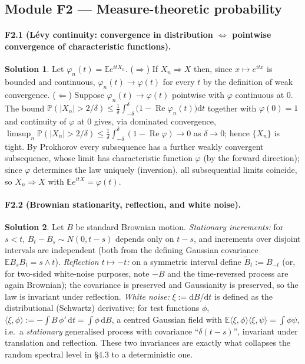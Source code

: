 \documentclass[11pt]{article}
\newcommand{\E}{\mathbb{E}}
\renewcommand{\Pr}{\mathbb{P}}
\newcommand{\dd}{\mathrm{d}}
\theoremstyle{definition}
\newtheorem*{sol}{Solution}
\begin{document}
\subsection*{Module F2 --- Measure-theoretic probability}

\paragraph{F2.1 (L\'evy continuity: convergence in distribution $\Leftrightarrow$ pointwise
convergence of characteristic functions).}
\begin{sol}
Let $\varphi_n(t)=\E e^{itX_n}$. ($\Rightarrow$) If $X_n\Rightarrow X$ then, since
$x\mapsto e^{itx}$ is bounded and continuous, $\varphi_n(t)\to\varphi(t)$ for every $t$ by the
definition of weak convergence. ($\Leftarrow$) Suppose $\varphi_n(t)\to\varphi(t)$ pointwise with
$\varphi$ continuous at $0$. The bound
$\Pr(|X_n|>2/\delta)\le \tfrac1\delta\int_{-\delta}^{\delta}\!\bigl(1-\operatorname{Re}\varphi_n(t)\bigr)\dd t$
together with $\varphi(0)=1$ and continuity of $\varphi$ at $0$ gives, via dominated convergence,
$\limsup_n\Pr(|X_n|>2/\delta)\le \tfrac1\delta\int_{-\delta}^{\delta}(1-\operatorname{Re}\varphi)\to0$
as $\delta\to0$; hence $\{X_n\}$ is tight. By Prokhorov every subsequence has a further weakly
convergent subsequence, whose limit has characteristic function $\varphi$ (by the forward
direction); since $\varphi$ determines the law uniquely (inversion), all subsequential limits
coincide, so $X_n\Rightarrow X$ with $\E e^{itX}=\varphi(t)$.
\end{sol}

\paragraph{F2.2 (Brownian stationarity, reflection, and white noise).}
\begin{sol}
Let $B$ be standard Brownian motion. \emph{Stationary increments:} for $s<t$,
$B_t-B_s\sim N(0,t-s)$ depends only on $t-s$, and increments over disjoint intervals are
independent (both from the defining Gaussian covariance $\E B_sB_t=s\wedge t$). \emph{Reflection
$t\mapsto-t$:} on a symmetric interval define $\tilde B_t:=B_{-t}$ (or, for two-sided white-noise
purposes, note $-B$ and the time-reversed process are again Brownian); the covariance is
preserved and Gaussianity is preserved, so the law is invariant under reflection. \emph{White
noise:} $\xi:=\dd B/\dd t$ is defined as the distributional (Schwartz) derivative; for test
functions $\phi$, $\langle\xi,\phi\rangle:=-\int B\,\phi'\,\dd t=\int\phi\,\dd B$, a centred
Gaussian field with $\E\langle\xi,\phi\rangle\langle\xi,\psi\rangle=\int\phi\psi$, i.e.\ a
\emph{stationary} generalised process with covariance ``$\delta(t-s)$'', invariant under
translation and reflection. These two invariances are exactly what collapses the random spectral
level in \S4.3 to a deterministic one.
\end{sol}
\end{document}
